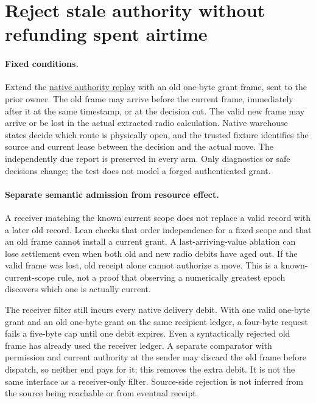 \documentclass{article}
\begin{document}
\section*{Reject stale authority without refunding spent airtime}
\paragraph{Fixed conditions.}
Extend the \href{https://github.com/eternal-november/eos-research-programmes/pull/819}{native authority replay}
with an old one-byte grant frame, sent to the prior owner. The old
frame may arrive before the current frame, immediately after it at
the same timestamp, or at the decision cut. The valid new frame
may arrive or be lost in the actual extracted radio calculation.
Native warehouse states decide which route is physically open,
and the trusted fixture identifies the source and current lease
between the decision and the actual move. The independently due
report is preserved in every arm. Only diagnostics or safe decisions
change; the test does not model a forged authenticated grant.

\paragraph{Separate semantic admission from resource effect.}
A receiver matching the known current scope does not replace
a valid record with a later old record. Lean checks that order
independence for a fixed scope and that an old frame cannot
install a current grant. A last-arriving-value ablation can lose
settlement even when both old and new radio debits have aged
out. If the valid frame was lost, old receipt alone cannot
authorize a move. This is a known-current-scope rule, not a
proof that observing a numerically greatest epoch discovers
which one is actually current.

The receiver filter still incurs every native delivery debit.
With one valid one-byte grant and an old one-byte grant
on the same recipient ledger, a four-byte request fails a
five-byte cap until one debit expires. Even a syntactically
rejected old frame has already used the receiver ledger.
A separate comparator with permission and current authority
at the sender may discard the old frame before dispatch,
so neither end pays for it; this removes the extra debit.
It is not the same interface as a receiver-only filter.
Source-side rejection is not inferred from the source being
reachable or from eventual receipt.
\end{document}
